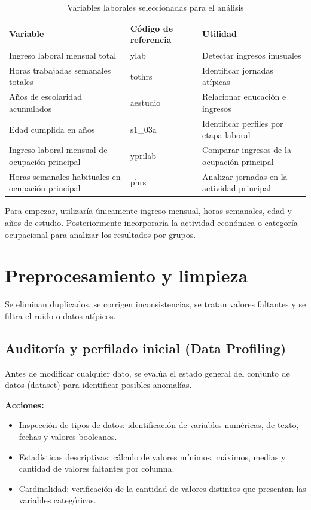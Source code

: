 \documentclass[12pt,a4paper]{article}
\begin{document}
\begin{table}[H]
\centering
\caption{Variables laborales seleccionadas para el análisis}
\begin{tabular}{@{}p{5cm}p{2.5cm}p{7cm}@{}}
\toprule
\textbf{Variable} & \textbf{Código de referencia} & \textbf{Utilidad} \\
\midrule
Ingreso laboral mensual total & ylab & Detectar ingresos inusuales \\
Horas trabajadas semanales totales & tothrs & Identificar jornadas atípicas \\
Años de escolaridad acumulados & aestudio & Relacionar educación e ingresos \\
Edad cumplida en años & s1\_03a & Identificar perfiles por etapa laboral \\
Ingreso laboral mensual de ocupación principal & yprilab & Comparar ingresos de la ocupación principal \\
Horas semanales habituales en ocupación principal & phrs & Analizar jornadas en la actividad principal \\
\bottomrule
\end{tabular}
\end{table}

Para empezar, utilizaría únicamente ingreso mensual, horas semanales, edad y años de estudio. Posteriormente incorporaría la actividad económica o categoría ocupacional para analizar los resultados por grupos.

\section{Preprocesamiento y limpieza}

Se eliminan duplicados, se corrigen inconsistencias, se tratan valores faltantes y se filtra el ruido o datos atípicos.

\subsection{Auditoría y perfilado inicial (Data Profiling)}

Antes de modificar cualquier dato, se evalúa el estado general del conjunto de datos (dataset) para identificar posibles anomalías.

\textbf{Acciones:}
\begin{itemize}
  \item Inspección de tipos de datos: identificación de variables numéricas, de texto, fechas y valores booleanos.
  \item Estadísticas descriptivas: cálculo de valores mínimos, máximos, medias y cantidad de valores faltantes por columna.
  \item Cardinalidad: verificación de la cantidad de valores distintos que presentan las variables categóricas.
\end{itemize}
\end{document}
